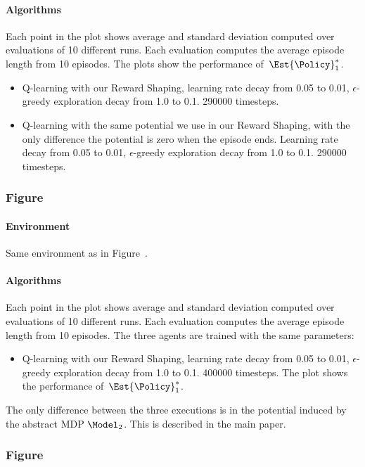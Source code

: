 \paragraph{Algorithms}
Each point in the plot shows average and standard deviation computed over evaluations of 10 different runs.
Each evaluation computes the average episode length from 10 episodes.
The plots show the performance of~$\Est{\Policy}_1^*$.
\begin{itemize}
	\item Q-learning with our Reward Shaping,
		learning rate decay from 0.05 to 0.01,
		$\epsilon$-greedy exploration decay from 1.0 to 0.1.
		290000 timesteps.
	\item Q-learning with the same potential we use in our Reward Shaping,
		with the only difference the potential is zero when the episode ends.
		Learning rate decay from 0.05 to 0.01,
		$\epsilon$-greedy exploration decay from 1.0 to 0.1.
		290000 timesteps.
\end{itemize}


\subsubsection*{Figure~}
\paragraph{Environment}
Same environment as in Figure~.

\paragraph{Algorithms}
Each point in the plot shows average and standard deviation computed over evaluations of 10 different runs.
Each evaluation computes the average episode length from 10 episodes.
The three agents are trained with the same parameters:
\begin{itemize}
	\item Q-learning with our Reward Shaping,
		learning rate decay from 0.05 to 0.01,
		$\epsilon$-greedy exploration decay from 1.0 to 0.1.
		400000 timesteps.
		The plot shows the performance of~$\Est{\Policy}_1^*$.
\end{itemize}
The only difference between the three executions is in the potential induced by the abstract MDP $\Model_2$.
This is described in the main paper.


\subsubsection*{Figure~}
